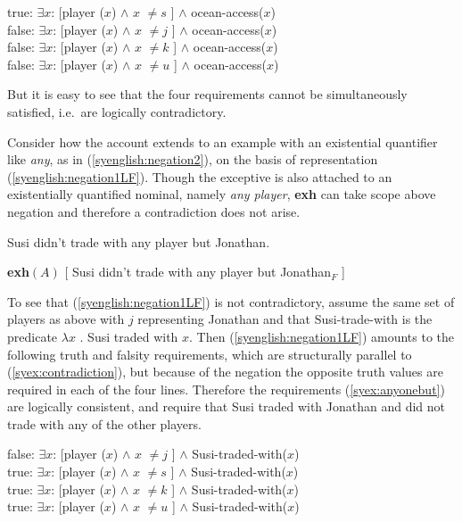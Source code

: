 \documentclass[output=paper,colorlinks,citecolor=brown,
]{langscibook}
\begin{document}
\ea \label{syex:contradiction}
    true: $\exists x$: [player ($x$) $\land$ $x$ $\neq s$ ] $\land$ ocean-access($x$)\\
    false: $\exists x$: [player ($x$) $\land$ $x$ $\neq j$ ] $\land$ ocean-access($x$)\\
	  false: $\exists x$: [player ($x$) $\land$ $x$ $\neq k$ ] $\land$ ocean-access($x$)\\
    false: $\exists x$: [player ($x$) $\land$ $x$ $\neq u$ ] $\land$ ocean-access($x$)\z

But it is easy to see that the four requirements cannot be simultaneously satisfied, i.e.\  are logically contradictory.

Consider how the account extends to an example with an existential quantifier like \emph{any}, as in (\ref{syenglish:negation2}),  on the basis of representation (\ref{syenglish:negation1LF}).
Though the exceptive is also attached to an existentially quantified nominal, namely \emph{any player}, \textbf{exh} can take scope above negation and therefore a contradiction does not arise.

\ea \label{syenglish:negation2} 
Susi didn't trade with any player but Jonathan.\z

\ea \label{syenglish:negation1LF}
\textbf{exh}$(A)$ [ Susi didn't trade with any player but Jonathan$_F$ ]\z


To see that (\ref{syenglish:negation1LF}) is not contradictory, assume the same set of players as above with $j$ representing Jonathan and that Susi-trade-with is the predicate $\lambda x$ . Susi traded with $x$.  Then (\ref{syenglish:negation1LF}) amounts to the following truth and falsity requirements, which are structurally parallel to (\ref{syex:contradiction}), but because of the negation the opposite truth values are required in each of the four lines.  Therefore the requirements (\ref{syex:anyonebut}) are logically consistent, and require that Susi traded with Jonathan and did not trade with any of the other players.

\ea \label{syex:anyonebut}
    false: $\exists x$: [player ($x$) $\land$ $x$ $\neq j$ ] $\land$ Susi-traded-with($x$)\\
    true: $\exists x$: [player ($x$) $\land$ $x$ $\neq s$ ] $\land$ Susi-traded-with($x$)\\
	  true: $\exists x$: [player ($x$) $\land$ $x$ $\neq k$ ] $\land$ Susi-traded-with($x$)\\
    true: $\exists x$: [player ($x$) $\land$ $x$ $\neq u$ ] $\land$ Susi-traded-with($x$)\z
\end{document}
